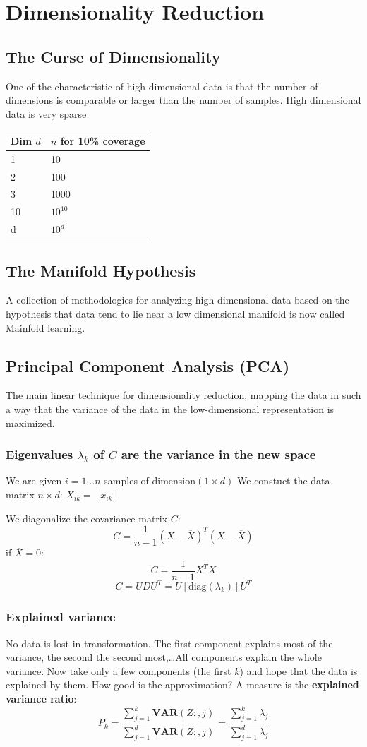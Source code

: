 \section{Dimensionality Reduction}
\subsection{The Curse of Dimensionality}
One of the characteristic of high-dimensional data is that the number of dimensions is comparable or larger than the number of samples.
High dimensional data is very sparse
\begin{table}[!h]
    \begin{tabular}{l|l}
        \hline
     Dim \(d\)& \(n\) for 10\% coverage \\
     \hline
     1&  10\\
     2&  100\\
     3&  1000\\
     10& \(10^10\)\\
     d& \(10^d\)
    \end{tabular}
    \end{table}
\subsection{The Manifold Hypothesis}
A collection of methodologies for analyzing high dimensional data based on the hypothesis that data tend to lie near a low dimensional manifold is now called Mainfold learning.
\subsection{Principal Component Analysis (PCA)}
The main linear technique for dimensionality reduction, mapping the data in such a way that the variance of the data in the low-dimensional representation is maximized.
\subsubsection{Eigenvalues \(\lambda_k\) of \(
C\) are the variance in the new space}
We are given \(i = 1 \dots n\) samples of dimension\((1 \times d)\)
We constuct the data matrix \(n\times d\): \(X_{ik} = \left[x_{ik}\right]\)

We diagonalize the covariance matrix \(C\):
\[
C = \frac{1}{n-1}(X-\overline{X})^T (X-\overline{X})
\]
if \(\overline{X} = 0\):
\[
C = \frac{1}{n-1}X^T X
\]
\[
C = UDU^T = U\left[\text{diag}(\lambda_k)\right]U^T
\]
\subsubsection{Explained variance}
No data is lost in transformation.
The first component explains most of the variance, the second the second most,\dots All components explain the whole variance.
Now take only a few components (the first \(k\)) and hope that the data is explained by them.
How good is the approximation?
A measure is the \textbf{explained variance ratio}:
\[
P_k = \frac{\sum_{j = 1}^k\textbf{VAR}(Z:,j)}{\sum_{j = 1}^d\textbf{VAR}(Z:,j)} = \frac{\sum_{j = 1}^k\lambda_j}{\sum_{j = 1}^d\lambda_j} 
\]
